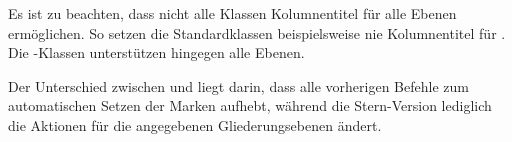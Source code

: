   Es ist zu beachten, dass nicht alle Klassen Kolumnentitel
  für alle Ebenen ermöglichen. So setzen die
  Standardklassen beispielsweise
  nie Kolumnentitel für . Die \KOMAScript-Klassen
  unterstützen hingegen alle Ebenen.

  Der Unterschied zwischen  und
   liegt darin, dass
   alle vorherigen Befehle zum automatischen Setzen der Marken
  aufhebt, während die Stern-Version  lediglich die Aktionen
  für die angegebenen Gliederungsebenen ändert.%
  \iffalse%
  \iffree{}{\par
    Das veraltete Paket
    \Package{scrpage2}\IndexPackage{scrpage2}\important{\Package{scrpage2}}
    kennt sowohl \Macro{manualmark} als auch \Macro{automark}, jedoch nicht
    \Macro{automark*}. Daher sind die nachfolgenden Beispielen nicht
    vollständig auf die Verwendung von \Package{scrpage2} übertragbar.%
  }%
  \fi
